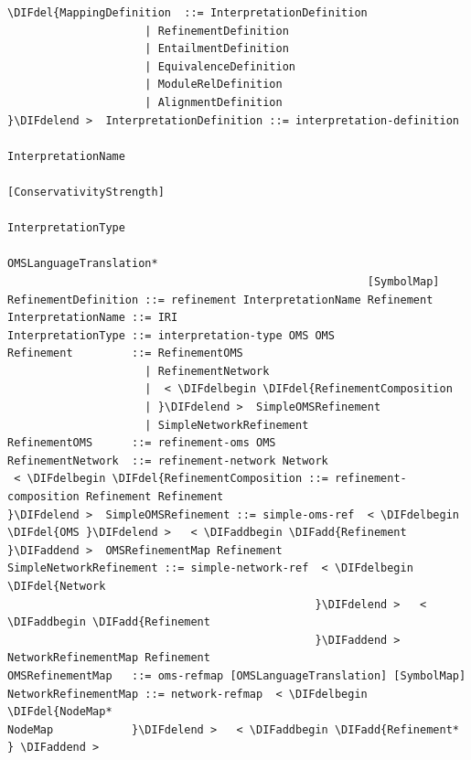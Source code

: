 \documentclass[10pt,fleqn,final]{scrreprt}
\newenvironment{definitions}[0]{\medskip }{}
\providecommand{\DIFadd}[1]{{\protect\color{blue}\uwave{#1}}} %
\providecommand{\DIFdel}[1]{{\protect\color{red}\sout{#1}}}                      %
\providecommand{\DIFaddbegin}{} %
\providecommand{\DIFaddend}{} %
\providecommand{\DIFdelbegin}{} %
\providecommand{\DIFdelend}{} %
\begin{document}
\begin{definitions}
\begin{lstlisting}[language=ebnf,escapeinside={<>},mathescape]
%DIFDELCMD < %%%
\DIFdel{MappingDefinition  ::= InterpretationDefinition
                     | RefinementDefinition
                     | EntailmentDefinition
                     | EquivalenceDefinition
                     | ModuleRelDefinition
                     | AlignmentDefinition
}\DIFdelend >  InterpretationDefinition ::= interpretation-definition
                                                       InterpretationName
                                                       [ConservativityStrength]
                                                       InterpretationType
                                                       OMSLanguageTranslation*
                                                       [SymbolMap]
RefinementDefinition ::= refinement InterpretationName Refinement
InterpretationName ::= IRI
InterpretationType ::= interpretation-type OMS OMS
Refinement         ::= RefinementOMS
                     | RefinementNetwork
                     |  < \DIFdelbegin \DIFdel{RefinementComposition
                     | }\DIFdelend >  SimpleOMSRefinement
                     | SimpleNetworkRefinement
RefinementOMS      ::= refinement-oms OMS
RefinementNetwork  ::= refinement-network Network
 < \DIFdelbegin \DIFdel{RefinementComposition ::= refinement-composition Refinement Refinement
}\DIFdelend >  SimpleOMSRefinement ::= simple-oms-ref  < \DIFdelbegin \DIFdel{OMS }\DIFdelend >   < \DIFaddbegin \DIFadd{Refinement }\DIFaddend >  OMSRefinementMap Refinement
SimpleNetworkRefinement ::= simple-network-ref  < \DIFdelbegin \DIFdel{Network
                                               }\DIFdelend >   < \DIFaddbegin \DIFadd{Refinement
                                               }\DIFaddend >  NetworkRefinementMap Refinement
OMSRefinementMap   ::= oms-refmap [OMSLanguageTranslation] [SymbolMap]
NetworkRefinementMap ::= network-refmap  < \DIFdelbegin \DIFdel{NodeMap*
NodeMap            }\DIFdelend >   < \DIFaddbegin \DIFadd{Refinement*
} \DIFaddend >
\end{lstlisting}


\end{definitions}
\end{document}
